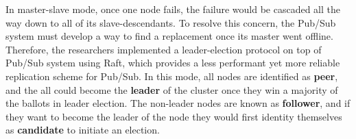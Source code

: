 In master-slave mode, once one node fails, the failure would be cascaded all the way down to all of its slave-descendants. To resolve this concern, the Pub/Sub system must develop a way to find a replacement once its master went offline. Therefore, the researchers implemented a leader-election protocol on top of Pub/Sub system using Raft, which provides a less performant yet more reliable replication scheme for Pub/Sub. In this mode, all nodes are identified as \textbf{peer}, and the all could become the \textbf{leader} of the cluster once they win a majority of the ballots in leader election. The non-leader nodes are known as \textbf{follower}, and if they want to become the leader of the node they would first identity themselves as \textbf{candidate} to initiate an election. 
